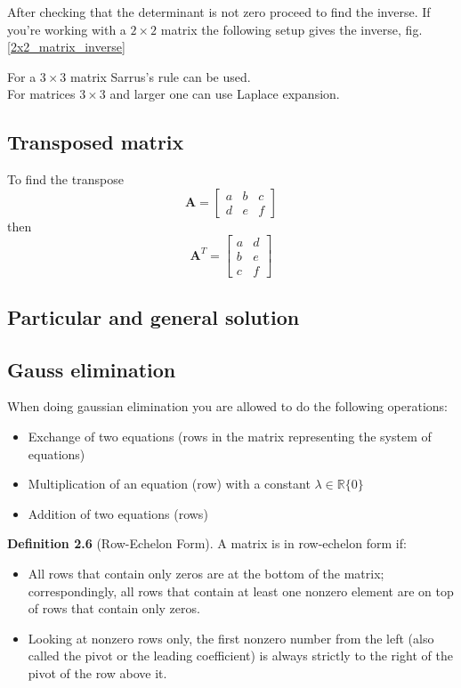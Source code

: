 After checking that the determinant is not zero proceed to find the inverse.
If you're working with a $2 \times 2$ matrix the following setup gives the inverse, fig. \ref{2x2_matrix_inverse}

%


\noindent
For a $3 \times 3$ matrix Sarrus's rule can be used.\\
For matrices $3 \times 3$ and larger one can use Laplace expansion.


\subsection{Transposed matrix}
To find the transpose 
$$
  \mathbf{A} = \begin{bmatrix}
a & b & c \\
d & e & f
\end{bmatrix}
$$
then
$$
  \mathbf{A}^T =
  \begin{bmatrix}
a & d \\
b & e \\
c & f
\end{bmatrix}
$$


\subsection{Particular and general solution}

\subsection{Gauss elimination}
When doing gaussian elimination you are allowed to do the following operations:
\begin{itemize}
  \item Exchange of two equations (rows in the matrix representing the system of equations)
  \item Multiplication of an equation (row) with a constant $\lambda \in \mathbb{R}\{0\}$
  \item Addition of two equations (rows)
\end{itemize}
\noindent
\textbf{Definition 2.6} (Row-Echelon Form). A matrix is in row-echelon form if:
\begin{itemize}
  \item All rows that contain only zeros are at the bottom of the matrix; correspondingly, all rows that contain at least one nonzero element are on top of rows that contain only zeros.
  \item Looking at nonzero rows only, the first nonzero number from the left (also called the pivot or the leading coefficient) is always strictly to the right of the pivot of the row above it.
\end{itemize}

